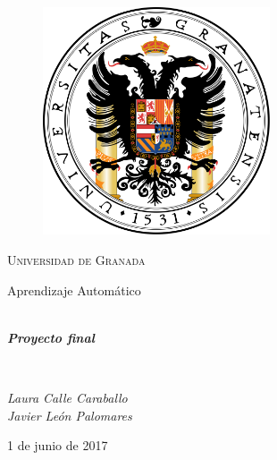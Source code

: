     \begin{titlepage}

        \centering

        \begin{figure}[h]

            \centering
            \includegraphics[width=0.6\textwidth]{logo-ugr.png}
            
        \end{figure}

        \vspace{1cm}

        {\scshape\huge Universidad de Granada}

        \vspace{1cm}

        {\LARGE Aprendizaje Automático}

        \vspace{1cm}

        \horrule{0.5pt} \\[0.4cm]

        {\Huge\bfseries\textit{Proyecto final}}

        \horrule{2pt} \\[0.5cm]

        \vspace{1cm}

        {\itshape\Large Laura Calle Caraballo \\
         Javier León Palomares}

        \vfill

        {\Large1 de junio de 2017}

    \end{titlepage}

\newpage